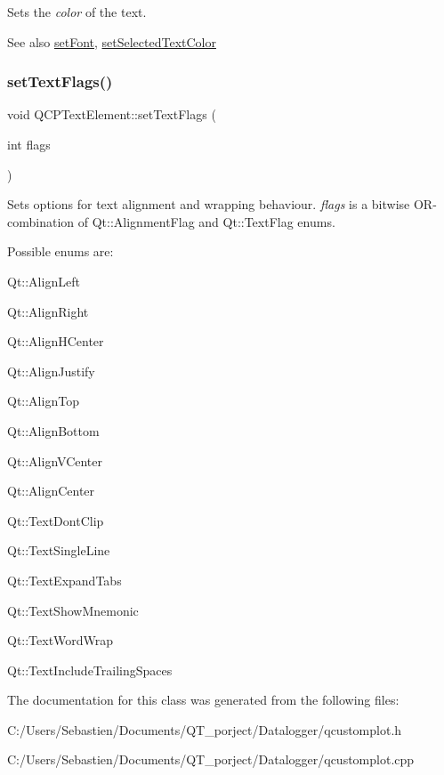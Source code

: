 Sets the {\itshape color} of the text.

\begin{DoxySeeAlso}{See also}
\hyperlink{class_q_c_p_text_element_a09b3241769528fa87cb4bf35c97defad}{set\+Font}, \hyperlink{class_q_c_p_text_element_abaec200cae70a0eade53583defc0476d}{set\+Selected\+Text\+Color} 
\end{DoxySeeAlso}
\mbox{\label{class_q_c_p_text_element_ab908f437f552020888a3ad8cf8242605}} 
\subsubsection{\texorpdfstring{set\+Text\+Flags()}{setTextFlags()}}
{\footnotesize\ttfamily void Q\+C\+P\+Text\+Element\+::set\+Text\+Flags (\begin{DoxyParamCaption}\item[{int}]{flags }\end{DoxyParamCaption})}

Sets options for text alignment and wrapping behaviour. {\itshape flags} is a bitwise O\+R-\/combination of {\ttfamily Qt\+::\+Alignment\+Flag} and {\ttfamily Qt\+::\+Text\+Flag} enums.

Possible enums are\+:
\begin{DoxyItemize}
\item Qt\+::\+Align\+Left
\item Qt\+::\+Align\+Right
\item Qt\+::\+Align\+H\+Center
\item Qt\+::\+Align\+Justify
\item Qt\+::\+Align\+Top
\item Qt\+::\+Align\+Bottom
\item Qt\+::\+Align\+V\+Center
\item Qt\+::\+Align\+Center
\item Qt\+::\+Text\+Dont\+Clip
\item Qt\+::\+Text\+Single\+Line
\item Qt\+::\+Text\+Expand\+Tabs
\item Qt\+::\+Text\+Show\+Mnemonic
\item Qt\+::\+Text\+Word\+Wrap
\item Qt\+::\+Text\+Include\+Trailing\+Spaces 
\end{DoxyItemize}

The documentation for this class was generated from the following files\+:\begin{DoxyCompactItemize}
\item 
C\+:/\+Users/\+Sebastien/\+Documents/\+Q\+T\+\_\+porject/\+Datalogger/qcustomplot.\+h\item 
C\+:/\+Users/\+Sebastien/\+Documents/\+Q\+T\+\_\+porject/\+Datalogger/qcustomplot.\+cpp\end{DoxyCompactItemize}
